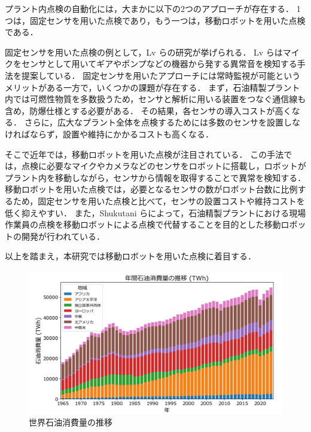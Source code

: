 \documentclass[../main]{subfiles}
\begin{document}
プラント内点検の自動化には，大まかに以下の2つのアプローチが存在する．
1つは，固定センサを用いた点検であり，もう一つは，移動ロボットを用いた点検である．

固定センサを用いた点検の例として，Lv らの研究が挙げられる\cite{Lv2023Overview}．
Lv らはマイクをセンサとして用いてギアやポンプなどの機器から発する異常音を検知する手法を提案している．
固定センサを用いたアプローチには常時監視が可能というメリットがある一方で，いくつかの課題が存在する．
まず，石油精製プラント内では可燃性物質を多数扱うため，センサと解析に用いる装置をつなぐ通信線も含め，防爆仕様とする必要がある．
その結果，各センサの導入コストが高くなる．
さらに，広大なプラント全体を点検するためには多数のセンサを設置しなければならず，設置や維持にかかるコストも高くなる．


そこで近年では，移動ロボットを用いた点検が注目されている．
この手法では，点検に必要なマイクやカメラなどのセンサをロボットに搭載し，ロボットがプラント内を移動しながら，センサから情報を取得することで異常を検知する．
移動ロボットを用いた点検では，必要となるセンサの数がロボット台数に比例するため，固定センサを用いた点検と比べて，センサの設置コストや維持コストを低く抑えやすい．
また，Shukutani らによって，石油精製プラントにおける現場作業員の点検を移動ロボットによる点検で代替することを目的とした移動ロボットの開発が行われている\cite{Shukutani2018}．

以上を踏まえ，本研究では移動ロボットを用いた点検に着目する．

\begin{figure}[t]
  \centering
  \includegraphics[keepaspectratio, width=1.0\linewidth]{chap1/oil_consumption.png}
  \caption{世界石油消費量の推移}
  \label{fig:oil_consumption}
\end{figure}
\end{document}
